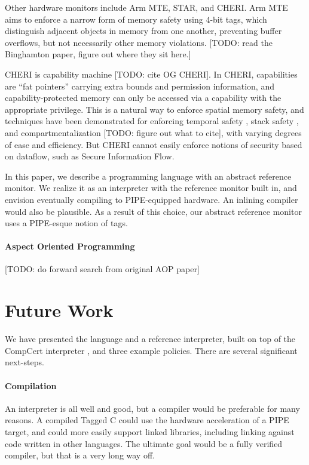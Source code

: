 \documentclass{llncs}
\begin{document}
Other hardware monitors include Arm MTE, STAR, and CHERI.
Arm MTE aims to enforce a narrow form of memory safety using 4-bit tags, which distinguish adjacent objects
in memory from one another, preventing buffer overflows, but not necessarily other memory violations.
[TODO: read the Binghamton paper, figure out where they sit here.] 

CHERI is capability machine [TODO: cite OG CHERI]. In CHERI, capabilities
are ``fat pointers'' carrying extra bounds and permission information, and capability-protected
memory can only be accessed via a capability with the appropriate privilege. This is a natural
way to enforce spatial memory safety, and techniques have been demonstrated for enforcing
temporal safety \cite{NWF20:Cornucopia}, stack safety \cite{Skorstengaard19:stktokens},
and compartmentalization [TODO: figure out what to cite], with varying degrees of ease and
efficiency. But CHERI cannot easily enforce notions of security based on dataflow,
such as Secure Information Flow.

In this paper, we describe a programming language with an abstract reference monitor.
We realize it as an interpreter with the reference monitor built in, and envision
eventually compiling to PIPE-equipped hardware. An inlining compiler would also be plausible.
As a result of this choice, our abstract reference monitor uses a PIPE-esque notion of
tags.

\paragraph{Aspect Oriented Programming}

[TODO: do forward search from original AOP paper]

\section{Future Work}
\label{sec:futurework}

We have presented the language and a reference interpreter, built on top of the CompCert interpreter
\cite{Leroy09:CompCert}, and three example policies. There are several significant next-steps.

\paragraph{Compilation}

An interpreter is all well and good, but a compiler would be preferable for many reasons.
A compiled Tagged C could use the hardware acceleration of a PIPE target, and could more easily
support linked libraries, including linking against code written in other languages.
The ultimate goal would be a fully verified compiler, but that is a very long way off.
\end{document}

